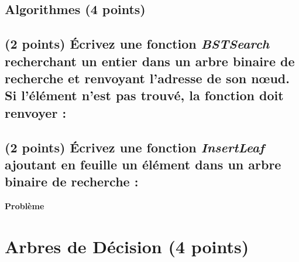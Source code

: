 \documentclass[11pt,a4paper]{article}
\begin{document}

\subsection*{Algorithmes (4 points) }

\subsection{(2 points) \'Ecrivez une fonction \textit{BSTSearch} recherchant un entier dans un arbre binaire de recherche et renvoyant l'adresse de son nœud. Si l'élément n'est pas trouvé, la fonction doit renvoyer  : }

\begin{center}
\end{center}


\subsection{(2 points) \'Ecrivez une fonction \textit{InsertLeaf} ajoutant en feuille un élément dans un arbre binaire de recherche : }

\begin{center}
\end{center}

\clearpage


\vfillFirst

\begin{center}
{\LARGE \textbf{Problème} }
\end{center}

\vfillLast

\clearpage


\vfillFirst

\section{Arbres de Décision (4 points) }

\end{document}
